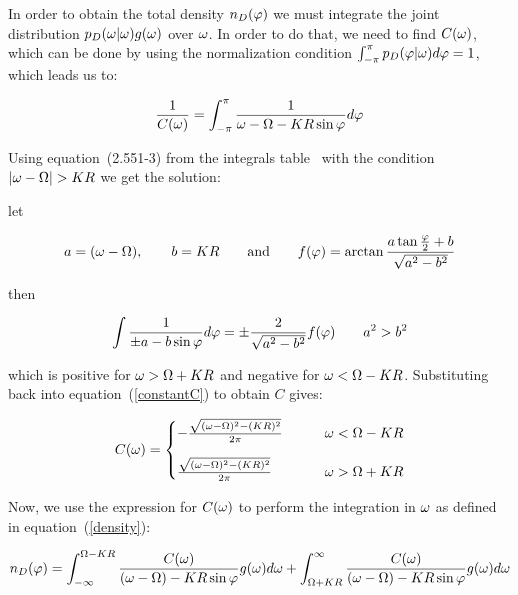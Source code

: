In order to obtain the total density $n_D(\varphi)$ we must integrate the joint distribution $p_D(\omega | \omega)g(\omega)$ over
$\omega$. In order to do that, we need to find $C(\omega)$, which can be done by using the normalization condition
$\int_{-\pi}^{\pi}p_D(\varphi | \omega)d\varphi=1$, which leads us to:

\begin{equation}
    \frac{1}{C(\omega)} = \int_{-\pi}^{\pi}\frac{1}{\omega - \Omega - K R \sin \varphi}d\varphi
    \label{constantC}
\end{equation}

\noindent Using equation~(2.551-3) from the integrals table~\cite{jeffrey2007table} with the condition $|\omega-\Omega| > K R$ we get
the solution:

\noindent let

\begin{equation*}
	a=(\omega-\Omega), \qquad b=K R \qquad \text{and} \qquad f(\varphi)=\arctan\frac{a\tan \frac{\varphi}{2}+b}{\sqrt{a^2-b^2}}
\end{equation*}

\noindent then

\begin{equation}
	\int\frac{1}{\pm a-b\sin \varphi}d\varphi = \pm\frac{2}{\sqrt{a^2-b^2}}f(\varphi) \qquad a^2 > b^2
\end{equation}

\noindent which is positive for $\omega > \Omega + K R$ and negative for $\omega < \Omega - K R$. Substituting back into
equation~(\ref{constantC}) to obtain $C$ gives:

\begin{equation}
    C(\omega) =
    \begin{cases}
        -\frac{\sqrt{(\omega-\Omega)^2 - (K R)^2}}{2\pi} \qquad &\omega < \Omega - K R \\[10pt]
        \frac{\sqrt{(\omega-\Omega)^2 - (K R)^2}}{2\pi} \qquad &\omega > \Omega + K R
    \end{cases}
    \label{constant}
\end{equation}

Now, we use the expression for $C(\omega)$ to perform the integration in $\omega$ as defined in equation~(\ref{density}):

\begin{equation}
	n_D(\varphi) = \int_{-\infty}^{\Omega - K R} \frac{C(\omega)}{(\omega - \Omega) - K R\sin\varphi}g(\omega)d\omega +
                   \int_{\Omega + K R}^{\infty} \frac{C(\omega)}{(\omega - \Omega) - K R\sin\varphi}g(\omega)d\omega
	\label{driftdensityintermediate}
\end{equation}

